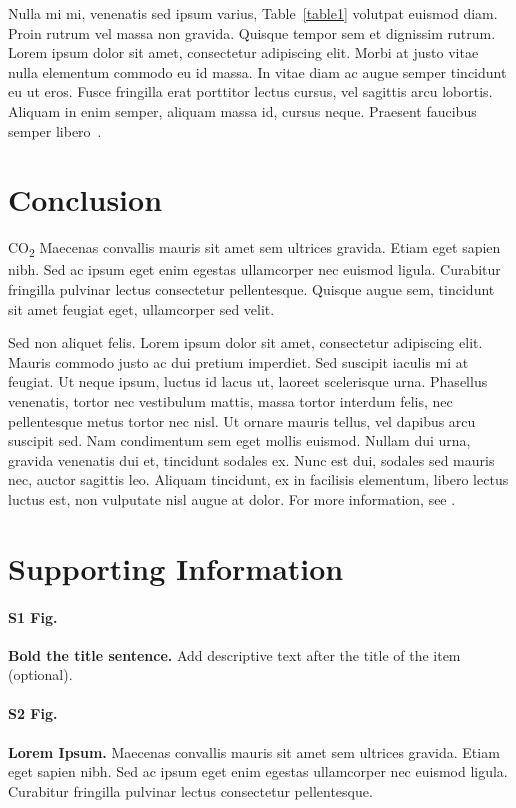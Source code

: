 \documentclass[10pt,letterpaper]{article}
\begin{document}
Nulla mi mi, venenatis sed ipsum varius, Table~\ref{table1} volutpat euismod diam. Proin rutrum vel massa non gravida. Quisque tempor sem et dignissim rutrum. Lorem ipsum dolor sit amet, consectetur adipiscing elit. Morbi at justo vitae nulla elementum commodo eu id massa. In vitae diam ac augue semper tincidunt eu ut eros. Fusce fringilla erat porttitor lectus cursus, vel sagittis arcu lobortis. Aliquam in enim semper, aliquam massa id, cursus neque. Praesent faucibus semper libero~\cite{bib3}.

\section*{Conclusion}

CO\textsubscript{2} Maecenas convallis mauris sit amet sem ultrices gravida. Etiam eget sapien nibh. Sed ac ipsum eget enim egestas ullamcorper nec euismod ligula. Curabitur fringilla pulvinar lectus consectetur pellentesque. Quisque augue sem, tincidunt sit amet feugiat eget, ullamcorper sed velit. 

Sed non aliquet felis. Lorem ipsum dolor sit amet, consectetur adipiscing elit. Mauris commodo justo ac dui pretium imperdiet. Sed suscipit iaculis mi at feugiat. Ut neque ipsum, luctus id lacus ut, laoreet scelerisque urna. Phasellus venenatis, tortor nec vestibulum mattis, massa tortor interdum felis, nec pellentesque metus tortor nec nisl. Ut ornare mauris tellus, vel dapibus arcu suscipit sed. Nam condimentum sem eget mollis euismod. Nullam dui urna, gravida venenatis dui et, tincidunt sodales ex. Nunc est dui, sodales sed mauris nec, auctor sagittis leo. Aliquam tincidunt, ex in facilisis elementum, libero lectus luctus est, non vulputate nisl augue at dolor. For more information, see .

\section*{Supporting Information}

\paragraph*{S1 Fig.}
\label{S1_Fig}
{\bf Bold the title sentence.} Add descriptive text after the title of the item (optional).

\paragraph*{S2 Fig.}
\label{S2_Fig}
{\bf Lorem Ipsum.} Maecenas convallis mauris sit amet sem ultrices gravida. Etiam eget sapien nibh. Sed ac ipsum eget enim egestas ullamcorper nec euismod ligula. Curabitur fringilla pulvinar lectus consectetur pellentesque.
\end{document}
